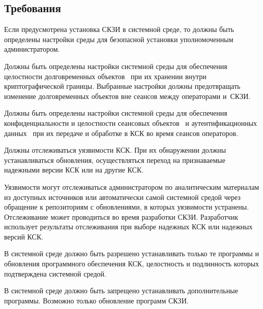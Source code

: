 \subsection{Требования}\label{ES.Reqs}

\label{R.ES.Install} %
Если предусмотрена установка СКЗИ в системной среде, то должны быть определены
настройки среды для безопасной установки уполномоченным администратором.

\label{R.ES.Objects} %
Должны быть определены настройки системной среды
для обеспечения целостности долговременных объектов~ 
при их хранении внутри криптографической границы. 
%
Выбранные настройки должны предотвращать 
изменение долговременных объектов вне сеансов между операторами и~СКЗИ.

\label{R.ES.Session} %
Должны быть определены настройки системной среды
для обеспечения конфиденциальности и целостности сеансовых 
объектов~ и аутентификационных 
данных~ при их передаче и  
обработке в КСК во время сеансов операторов.

\label{R.ES.CVE} %
Должны отслеживаться уязвимости КСК. При их обнаружении должны 
устанавливаться обновления, осуществляться переход на признаваемые надежными
версии КСК или на другие КСК.

\begin{note*}
Уязвимости могут отслеживаться администратором по аналитическим материалам из
доступных источников или автоматически самой системной средой через обращение к
репозиториям с обновлениями, в которых уязвимости устранены.
%
Отслеживание может проводиться во время разработки СКЗИ. Разработчик использует
результаты отслеживания при выборе надежных КСК или надежных версий КСК.
\end{note*}

\label{R.ES.AuthCode} %
В системной среде должно быть разрешено устанавливать только те программы и
обновления программного обеспечения КСК, целостность и подлинность которых
подтверждена системной средой.

\label{R.ES.NoCode} %
В системной среде должно быть запрещено устанавливать дополнительные программы.
Возможно только обновление программ СКЗИ.

